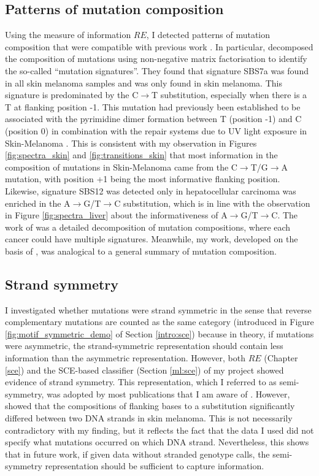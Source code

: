 \subsection{Patterns of mutation composition}
Using the measure of information $RE$, I detected patterns of mutation composition that were compatible with previous work \citep[Chapter \ref{sce};][]{Alexandrov2020}. In particular, \citet{Alexandrov2020} decomposed the composition of mutations using non-negative matrix factorisation to identify the so-called ``mutation signatures''. They found that signature SBS7a was found in all skin melanoma samples and was only found in skin melanoma. This signature is predominated by the C$\rightarrow$T substitution, especially when there is a T at flanking position -1. This mutation had previously been established to be associated with the pyrimidine dimer formation between T (position -1) and C (position 0) in combination with the repair systems due to UV light exposure in Skin-Melanoma \citep{Pfeifer2005MutationsLight}. This is consistent with my observation in Figures \ref{fig:spectra_skin} and \ref{fig:transitions_skin} that most information in the composition of mutations in Skin-Melanoma came from the C$\rightarrow$T/G$\rightarrow$A mutation, with position +1 being the most informative flanking position. Likewise, signature SBS12 was detected only in hepatocellular carcinoma was enriched in the A$\rightarrow$G/T$\rightarrow$C substitution, which is in line with the observation in Figure \ref{fig:spectra_liver} about the informativeness of A$\rightarrow$G/T$\rightarrow$C. The work of \citet{Alexandrov2020} was a detailed decomposition of mutation compositions, where each cancer could have multiple signatures. Meanwhile, my work, developed on the basis of \citet{Zhu2017}, was analogical to a general summary of mutation composition. 

\subsection{Strand symmetry}
I investigated whether mutations were strand symmetric in the sense that reverse complementary mutations are counted as the same category (introduced in Figure \ref{fig:motif_symmetric_demo} of Section \ref{intro:sce}) because in theory, if mutations were asymmetric, the strand-symmetric representation should contain less information than the asymmetric representation. However, both $RE$ (Chapter \ref{sce}) and the SCE-based classifier (Section \ref{ml:sce}) of my project showed evidence of strand symmetry. This representation, which I referred to as semi-symmetry, was adopted by most publications that I am aware of \citep{Alexandrov2020,Jiao2020,Zhang2020}. However, \citet{Zhu2017} showed that the compositions of flanking bases to a substitution significantly differed between two DNA strands in skin melanoma. This is not necessarily contradictory with my finding, but it reflects the fact that the data I used did not specify what mutations occurred on which DNA strand. Nevertheless, this shows that in future work, if given data without stranded genotype calls, the semi-symmetry representation should be sufficient to capture information.

